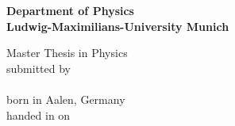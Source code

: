 \begin{titlepage}
\begin{center}
\makeatletter

\Large\textbf{Department of Physics\\
Ludwig-Maximilians-University Munich}

\vfill

\normalsize
Master Thesis in Physics\\
\normalsize
submitted by\\[0.5cm]
\Large
\textbf{\@author}\\
\normalsize
born in Aalen, Germany\\[0.5cm]
\normalsize
handed in on\\
\Large
\textbf{\@date}\\[0.5cm]
\normalsize


\cleardoublepage
\thispagestyle{empty}


\LARGE\textbf{\@title}

\vfill

\normalsize

\makeatother
\end{center}
\end{titlepage}

